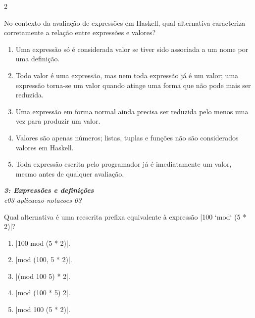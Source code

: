 \documentclass[a4paper,10pt,brazil]{article}
\begin{document}
\begin{multicols}{2}
\begin{flushright}
\end{flushright}
No contexto da avaliação de expressões em Haskell, qual alternativa caracteriza corretamente a relação entre expressões e valores?

\begin{enumerate}
  \item Uma expressão só é considerada valor se tiver sido associada a um nome por uma definição.

  \item Todo valor é uma expressão, mas nem toda expressão já é um valor; uma expressão torna-se um valor quando atinge uma forma que não pode mais ser reduzida.

  \item Uma expressão em forma normal ainda precisa ser reduzida pelo menos uma vez para produzir um valor.

  \item Valores são apenas números; listas, tuplas e funções não são considerados valores em Haskell.

  \item Toda expressão escrita pelo programador já é imediatamente um valor, mesmo antes de qualquer avaliação.


\end{enumerate}

\begin{flushright}
  \footnotesize
  \textit{\textbf{3: Expressões e definições}}\\
  \textit{c03-aplicacao-notacoes-03}\\

\end{flushright}
Qual alternativa é uma reescrita prefixa equivalente à expressão \haskellinline|100 `mod` (5 * 2)|?

\begin{enumerate}
  \item \haskellinline|100 mod (5 * 2)|.

  \item \haskellinline|mod (100, 5 * 2)|.

  \item \haskellinline|(mod 100 5) * 2|.

  \item \haskellinline|mod (100 * 5) 2|.

  \item \haskellinline|mod 100 (5 * 2)|.


\end{enumerate}


\end{multicols}
\end{document}
